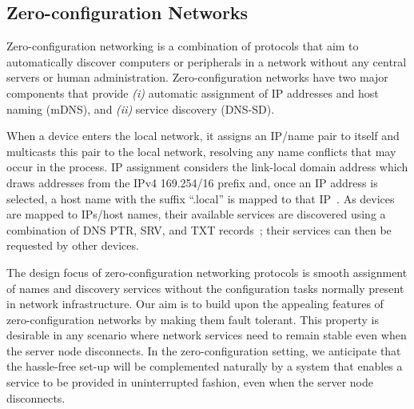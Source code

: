 \subsection{Zero-configuration Networks}
\label{sec:zeroconf}

Zero-configuration networking is a combination of protocols that aim to automatically discover computers or peripherals in a network without any central servers or human administration. Zero-configuration networks have two major components that provide {\it (i)} automatic assignment of IP addresses and host naming (mDNS), and {\it (ii)} service discovery (DNS-SD).

When a device enters the local network, it assigns an IP/name pair to itself and  multicasts this pair to the local network, resolving any name conflicts that may occur in the process. IP assignment considers the link-local domain address which draws addresses from the IPv4 169.254/16 prefix and, once an IP address is selected, a host name with the suffix ``.local'' is mapped to that IP~\cite{rfc6762}. As devices are mapped to IPs/host names, their available services are discovered using a combination of DNS PTR, SRV, and TXT records~\cite{rfc6763}; their services can then be requested by other devices.

The design focus of zero-configuration networking protocols is smooth assignment of names and discovery services without the configuration tasks normally present in network infrastructure. 
Our aim is to build upon the appealing features of zero-configuration networks by making them fault tolerant.
This property is desirable in any scenario where network services need to remain stable even when the server node disconnects.
In the zero-configuration setting, we anticipate that the hassle-free set-up will be complemented naturally by a system that enables a service to be provided in uninterrupted fashion, even when the server node disconnects.
